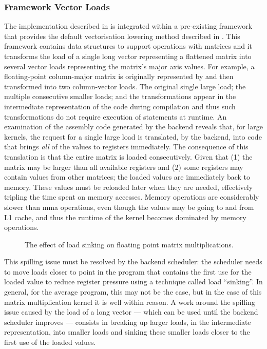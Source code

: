 \documentclass[\main/thesis.tex]{subfiles}
\begin{document}
\subsubsection{Framework Vector Loads}
\label{sec:test}
The implementation described in   is integrated within a pre-existing framework that provides the default vectorisation lowering method described in .
This framework contains data structures to support operations with matrices and it transforms the load of a single long vector representing a flattened matrix into several vector loads representing the matrix's major axis values.
For example, a floating-point column-major matrix  is originally represented by  and then transformed into two  column-vector loads.
The original single large load;  the multiple consecutive smaller loads; and the transformations appear  in the intermediate representation of the code during compilation and thus such transformations do not require execution of statements at runtime.
An examination of the assembly code generated by the backend reveals that, for large kernels, the request for a single large load is translated, by the backend, into code that brings \emph{all} of the values to registers immediately.
The consequence of this translation is that the entire matrix is loaded consecutively.
Given that (1) the matrix may be larger than all available registers and (2) some registers may contain values from other matrices; the loaded values are immediately  back to memory.
These values must be reloaded later when they are needed, effectively tripling the time spent on memory accesses.
Memory operations are considerably slower than \gls{mma} operations, even though the values may be going to and from L1 cache, and thus the runtime of the kernel becomes dominated by memory operations.

\begin{figure}
  \centering
  
  \caption{The effect of load sinking on floating point matrix multiplications.}
  \label{fig:floatSink}
\end{figure}

This spilling issue must be resolved by the backend scheduler\footnotemark: the scheduler needs to move loads closer to  \gls{point} in the program that contains the first use for the loaded value to reduce register pressure using a technique called load ``sinking''.
In general, for the average program, this may not be the case, but in the case of this matrix multiplication kernel it is well within reason.
A work around the  spilling issue caused  by the load of a long vector --- which can be used until the backend scheduler improves --- consists  in breaking up larger loads, in the  intermediate representation, into smaller loads and sinking these smaller loads closer to the first use of the loaded values.
\end{document}
